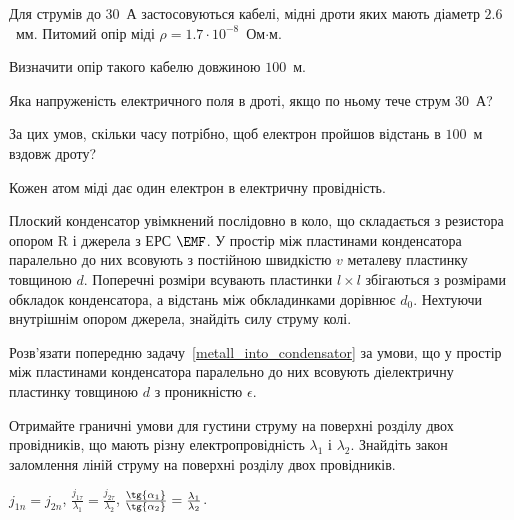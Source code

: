 \begin{problem}
    Для струмів до $30$~А застосовуються кабелі, мідні дроти яких мають діаметр $2.6$~мм. Питомий опір міді $\rho = 1.7\cdot 10^{-8}$~Ом$\cdot$м. 
	\begin{enumerate*}[label=\alph*)]
		\item Визначити опір такого кабелю довжиною $100$~м. 
		\item Яка напруженість електричного поля в дроті, якщо по ньому тече струм $30$~А?
		\item За цих умов, скільки часу потрібно, щоб електрон пройшов відстань в $100$~м вздовж дроту?
	\end{enumerate*}
  Кожен атом міді дає один електрон в електричну провідність.
\end{problem}

\begin{problem}\label{metall_into_condensator}
    Плоский конденсатор увімкнений послідовно в коло, що складається з резистора опором R і джерела з ЕРС $\EMF$. У простір між пластинами конденсатора паралельно до них всовують з постійною швидкістю $v$ металеву пластинку товщиною $d$. Поперечні розміри всувають пластинки $l \times l$ збігаються з розмірами обкладок конденсатора, а відстань між обкладинками дорівнює $d_0$. Нехтуючи внутрішнім опором джерела, знайдіть силу струму колі.
\end{problem}

\begin{problem}\label{dielectric_into_condensator}
    Розв'язати попередню задачу~\ref{metall_into_condensator} за умови, що у простір між пластинами конденсатора паралельно до них всовують діелектричну пластинку товщиною $d$ з проникністю $\epsilon$.
\end{problem}

\begin{problem}
Отримайте граничні умови для густини струму на поверхні розділу двох провідників, що мають різну електропровідність $\lambda_1$ і $\lambda_2$. Знайдіть закон заломлення ліній струму на поверхні розділу двох провідників.
\begin{solution}
	$j_{1n} = j_{2n}$, $\frac{j_{1\tau}}{\lambda_1} = \frac{j_{2\tau}}{\lambda_2}$,
	$\frac{\tg{\alpha_1}}{\tg{\alpha_2}} = \frac{\lambda_1}{\lambda_2}$.
\end{solution}
\end{problem}

